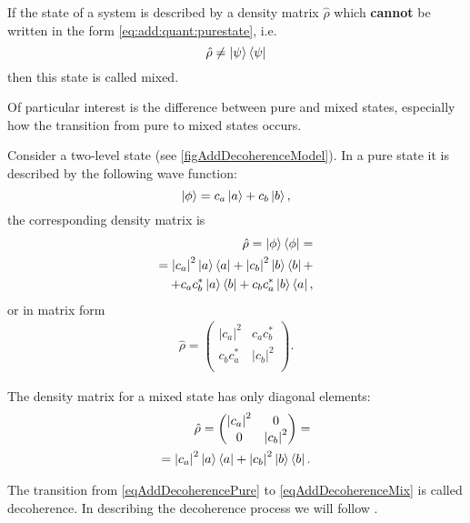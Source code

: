 \begin{definition}
If the state of a system is described by a density matrix $\hat{\rho}$
which \textbf{cannot} be written in the form
\eqref{eq:add:quant:purestate}, i.e. 
\[
\hat{\rho} \ne \ket{\psi}\bra{\psi}
\]
then this state is called mixed.
\end{definition}


Of particular interest is the difference between pure and mixed
states, especially how the transition from pure
to mixed states occurs.

Consider a two-level state
(see \autoref{figAddDecoherenceModel}). In a pure state it is described 
by the following wave function:
\begin{equation}
\left|\phi\right> = c_a \ket{a } + c_b \ket{b},
\nonumber
\end{equation}
the corresponding density matrix is
\begin{eqnarray}
\hat{\rho} = \left|\phi\right>\left<\phi\right| =
\nonumber \\
= 
\left|c_a\right|^2 \ket{a}\bra{a} + 
\left|c_b\right|^2 \ket{b}\bra{b} +
\nonumber \\
+
c_a c_b^{\ast}\ket{a}\bra{b} +
c_b c_a^{\ast}\ket{b}\bra{a},
\label{eqAddDecoherencePure}
\end{eqnarray}
or in matrix form
\begin{eqnarray}
\hat{\rho} = 
\begin{pmatrix}
\left|c_a\right|^2 & c_a c_b^{\ast} \\
c_b c_a^{\ast} & \left|c_b\right|^2 \\
\end{pmatrix}.
\nonumber
\end{eqnarray}

The density matrix 
for a mixed state has only diagonal
elements:
\begin{eqnarray}
\hat{\rho} = 
\begin{pmatrix}
\left|c_a\right|^2 & 0 \\
0 & \left|c_b\right|^2 \\
\end{pmatrix} = 
\nonumber \\
=
\left|c_a\right|^2 \ket{a}\bra{a} + 
\left|c_b\right|^2 \ket{b}\bra{b}.
\label{eqAddDecoherenceMix}
\end{eqnarray}



The transition from \eqref{eqAddDecoherencePure} to \eqref{eqAddDecoherenceMix}
is called decoherence.
In describing the decoherence process we will follow
\cite{bMensky2001}. 

